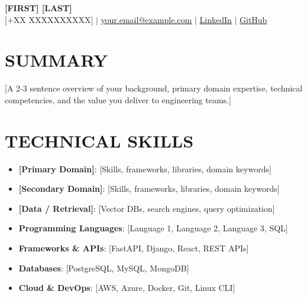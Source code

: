 \documentclass[letterpaper,10pt]{article}
\begin{document}
\begin{center}
    {\Huge \textbf{[FIRST] [LAST]}} \\ \vspace{3pt}
    \small [+XX XXXXXXXXXX] \quad$|$\quad
    \href{mailto:your.email@example.com}{\underline{your.email@example.com}} \quad$|$\quad
    \href{https://linkedin.com/in/your-profile}{\underline{LinkedIn}} \quad$|$\quad
    \href{https://github.com/your-username}{\underline{GitHub}}
\end{center}

\vspace{-4pt}
\section*{SUMMARY}
\small{[A 2-3 sentence overview of your background, primary domain expertise, technical competencies, and the value you deliver to engineering teams.]}

\section*{TECHNICAL SKILLS}
\vspace{-2pt}
\begin{minipage}[t]{0.49\textwidth}
\begin{itemize}[leftmargin=10pt, noitemsep, topsep=0pt]
    \item \textbf{[Primary Domain]}: [Skills, frameworks, libraries, domain keywords]
    \item \textbf{[Secondary Domain]}: [Skills, frameworks, libraries, domain keywords]
    \item \textbf{[Data / Retrieval]}: [Vector DBs, search engines, query optimization]
\end{itemize}
\end{minipage}\hfill
\begin{minipage}[t]{0.49\textwidth}
\begin{itemize}[leftmargin=10pt, noitemsep, topsep=0pt]
    \item \textbf{Programming Languages}: [Language 1, Language 2, Language 3, SQL]
    \item \textbf{Frameworks \& APIs}: [FastAPI, Django, React, REST APIs]
    \item \textbf{Databases}: [PostgreSQL, MySQL, MongoDB]
    \item \textbf{Cloud \& DevOps}: [AWS, Azure, Docker, Git, Linux CLI]
\end{itemize}
\end{minipage}
\end{document}
